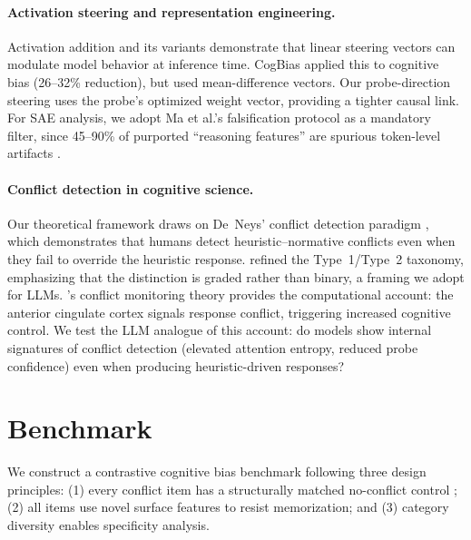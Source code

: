 \documentclass{article}
\begin{document}
\paragraph{Activation steering and representation engineering.}
Activation addition \citep{turner2023activation} and its variants
\citep{rimsky2024steering, li2024inference} demonstrate that linear
steering vectors can modulate model behavior at inference time.
CogBias \citep{huang2026cogbias} applied this to cognitive bias (26--32\%
reduction), but used mean-difference vectors.  Our probe-direction
steering uses the probe's optimized weight vector, providing a tighter
causal link.  For SAE analysis, we adopt Ma et al.'s falsification
protocol \citep{ma2026falsification} as a mandatory filter, since
45--90\% of purported ``reasoning features'' are spurious token-level
artifacts \citep{meloux2025dead}.

\paragraph{Conflict detection in cognitive science.}
Our theoretical framework draws on De~Neys' conflict detection paradigm
\citep{deneys2012bias, deneys2017dual}, which demonstrates that humans
detect heuristic--normative conflicts even when they fail to override the
heuristic response.  \citet{evans2013dual} refined the Type~1/Type~2
taxonomy, emphasizing that the distinction is graded rather than binary,
a framing we adopt for LLMs.  \citet{botvinick2001conflict}'s conflict
monitoring theory provides the computational account: the anterior
cingulate cortex signals response conflict, triggering increased cognitive
control.  We test the LLM analogue of this account: do models show
internal signatures of conflict detection (elevated attention entropy,
reduced probe confidence) even when producing heuristic-driven responses?


\section{Benchmark}
\label{sec:benchmark}

We construct a contrastive cognitive bias benchmark following three
design principles: (1) every conflict item has a structurally matched
no-conflict control \citep{deneys2012bias}; (2) all items use novel
surface features to resist memorization; and (3) category diversity
enables specificity analysis.
\end{document}

